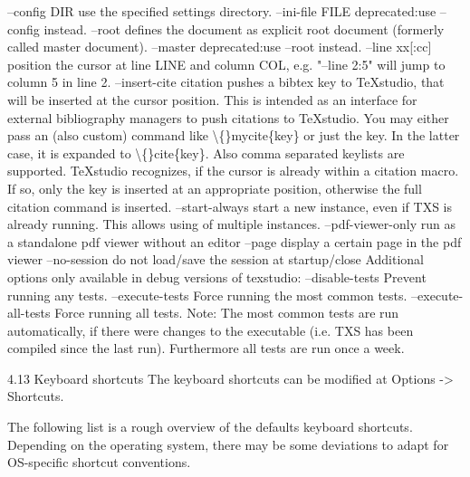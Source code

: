 \documentclass{article}
\begin{document}
	--config DIR	use the specified settings directory.
	--ini-file FILE	deprecated:use --config instead.
	--root	defines the document as explicit root document (formerly called master document).
	--master	deprecated:use --root instead.
	--line xx[:cc]	position the cursor at line LINE and column COL, e.g. "--line 2:5" will jump to column 5 in line 2.
	--insert-cite citation	pushes a bibtex key to TeXstudio, that will be inserted at the cursor position. This is intended as an interface for external bibliography managers to push citations to TeXstudio. You may either pass an (also custom) command like \textbackslash\{\}mycite\{key\} or just the key. In the latter case, it is expanded to \textbackslash\{\}cite\{key\}. Also comma separated keylists are supported. TeXstudio recognizes, if the cursor is already within a citation macro. If so, only the key is inserted at an appropriate position, otherwise the full citation command is inserted.
	--start-always	start a new instance, even if TXS is already running. This allows using of multiple instances.
	--pdf-viewer-only	run as a standalone pdf viewer without an editor
	--page	display a certain page in the pdf viewer
	--no-session	do not load/save the session at startup/close
	Additional options only available in debug versions of texstudio:
	--disable-tests	Prevent running any tests.
	--execute-tests	Force running the most common tests.
	--execute-all-tests	Force running all tests.
	Note: The most common tests are run automatically, if there were changes to the executable (i.e. TXS has been compiled since the last run). Furthermore all tests are run once a week.
	
	4.13 Keyboard shortcuts
	The keyboard shortcuts can be modified at Options -> Shortcuts.
	
	The following list is a rough overview of the defaults keyboard shortcuts. Depending on the operating system, there may be some deviations to adapt for OS-specific shortcut conventions.
	
\end{document}
